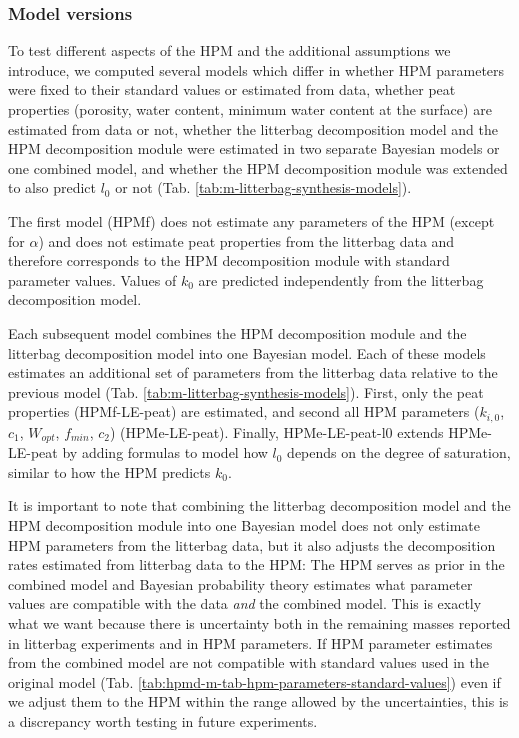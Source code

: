 \documentclass[
  12pt,
]{article}
\begin{document}
\hypertarget{sdm-003-methods-8}{%
\subsubsection{Model versions}\label{sdm-003-methods-8}}

To test different aspects of the HPM and the additional assumptions we introduce, we computed several models which differ in whether HPM parameters were fixed to their standard values or estimated from data, whether peat properties (porosity, water content, minimum water content at the surface) are estimated from data or not, whether the litterbag decomposition model and the HPM decomposition module were estimated in two separate Bayesian models or one combined model, and whether the HPM decomposition module was extended to also predict \(l_0\) or not (Tab. \ref{tab:m-litterbag-synthesis-models}).

The first model (HPMf) does not estimate any parameters of the HPM (except for \(\alpha\)) and does not estimate peat properties from the litterbag data and therefore corresponds to the HPM decomposition module with standard parameter values. Values of \(k_0\) are predicted independently from the litterbag decomposition model.

Each subsequent model combines the HPM decomposition module and the litterbag decomposition model into one Bayesian model. Each of these models estimates an additional set of parameters from the litterbag data relative to the previous model (Tab. \ref{tab:m-litterbag-synthesis-models}). First, only the peat properties (HPMf-LE-peat) are estimated, and second all HPM parameters (\(k_{i,0}\), \(c_1\), \(W_{opt}\), \(f_{min}\), \(c_2\)) (HPMe-LE-peat). Finally, HPMe-LE-peat-l0 extends HPMe-LE-peat by adding formulas to model how \(l_0\) depends on the degree of saturation, similar to how the HPM predicts \(k_0\).

It is important to note that combining the litterbag decomposition model and the HPM decomposition module into one Bayesian model does not only estimate HPM parameters from the litterbag data, but it also adjusts the decomposition rates estimated from litterbag data to the HPM: The HPM serves as prior in the combined model and Bayesian probability theory estimates what parameter values are compatible with the data \emph{and} the combined model. This is exactly what we want because there is uncertainty both in the remaining masses reported in litterbag experiments and in HPM parameters. If HPM parameter estimates from the combined model are not compatible with standard values used in the original model (Tab. \ref{tab:hpmd-m-tab-hpm-parameters-standard-values}) even if we adjust them to the HPM within the range allowed by the uncertainties, this is a discrepancy worth testing in future experiments.
\end{document}
